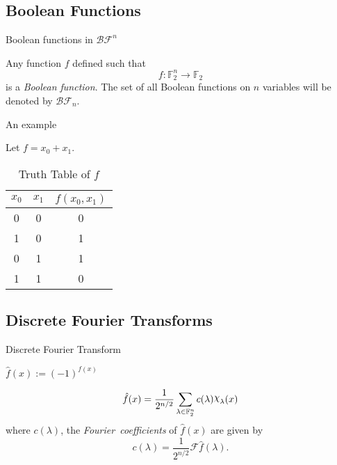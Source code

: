 \documentclass{beamer}
\def\gftwo{\mathbb{F}_2}
\def\BF{\mathcal{BF}}
\def\Chi{\raisebox{2pt}{$\chi$}}
\begin{document}
\subsection{Boolean Functions}
\begin{frame}{Boolean functions in $\BF^n$}
  \begin{definition}
  \label{def:boolean-function}
    Any function $f$ defined such that 
    \begin{equation*}
      f:\gftwo^n\rightarrow\gftwo
    \end{equation*}
    is a {\em Boolean function}. The set of all Boolean functions on $n$
    variables will be denoted by $\BF_n$.
  \end{definition}
\end{frame}
\begin{frame}{An example}
  \begin{example}
    Let $f=x_0+x_1$.
    \begin{table}
    \label{tab:truth-table}
    	\centering
      \begin{tabular}{|c|c||c|}
        \hline
        $x_0$&$x_1$&$f(x_0,x_1)$\\
        \hline
        0&0&0\\
        1&0&1\\
        0&1&1\\
        1&1&0\\
      	\hline
    	\end{tabular}
    	\caption{Truth Table of $f$}
    \end{table}
  \end{example}
\end{frame}

\subsection{Discrete Fourier Transforms}
\begin{frame}{Discrete Fourier Transform}
  \begin{definition}
    $\hat{f}(x):=(-1)^{f(x)}$
  \end{definition}
  \begin{lemma}
  \begin{equation}\label{eqn:rewrite-pseudo}
  	\hat{f}(x)
      =\frac{1}{2^{n/2}}
        \sum_{\lambda\in\gftwo^n}c(\lambda)\Chi_\lambda(x)
  \end{equation}
  	where $c(\lambda)$, the {\em Fourier\ coefficients} of $\hat{f}(x)$ are
    given by
    \begin{equation}\label{eqn:clambda}
      c(\lambda)=\frac{1}{2^{n/2}}\mathcal{F}\hat{f}(\lambda).
    \end{equation}
  \end{lemma}
\end{frame}
\end{document}
